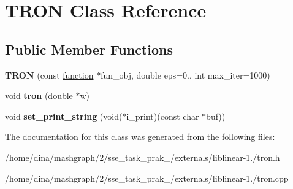 \hypertarget{class_t_r_o_n}{\section{T\-R\-O\-N Class Reference}
\label{class_t_r_o_n}
}
\subsection*{Public Member Functions}
\begin{DoxyCompactItemize}
\item 
\hypertarget{class_t_r_o_n_a7e52e99f80fb927af2edc8f6dc4612f9}{{\bfseries T\-R\-O\-N} (const \hyperlink{classfunction}{function} $\ast$fun\-\_\-obj, double eps=0., int max\-\_\-iter=1000)}\label{class_t_r_o_n_a7e52e99f80fb927af2edc8f6dc4612f9}

\item 
\hypertarget{class_t_r_o_n_a3dc84588675356a84d8b0edbf46223c8}{void {\bfseries tron} (double $\ast$w)}\label{class_t_r_o_n_a3dc84588675356a84d8b0edbf46223c8}

\item 
\hypertarget{class_t_r_o_n_a07d59d5e6ee86fe05b62f4ca629b7f00}{void {\bfseries set\-\_\-print\-\_\-string} (void($\ast$i\-\_\-print)(const char $\ast$buf))}\label{class_t_r_o_n_a07d59d5e6ee86fe05b62f4ca629b7f00}

\end{DoxyCompactItemize}


The documentation for this class was generated from the following files\-:\begin{DoxyCompactItemize}
\item 
/home/dina/mashgraph/2/sse\-\_\-task\-\_\-prak\-\_/externals/liblinear-\/1./tron.\-h\item 
/home/dina/mashgraph/2/sse\-\_\-task\-\_\-prak\-\_/externals/liblinear-\/1./tron.\-cpp\end{DoxyCompactItemize}
